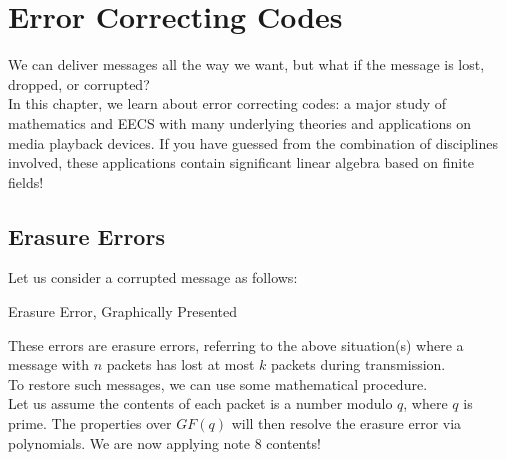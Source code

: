\chapter{Error Correcting Codes}
We can deliver messages all the way we want, but what if the message is lost, dropped, or corrupted? \\
In this chapter, we learn about error correcting codes: a major study of mathematics and EECS with many underlying theories and applications on media playback devices. If you have guessed from the combination of disciplines involved, these applications contain significant linear algebra based on finite fields!

\section{Erasure Errors}
Let us consider a corrupted message as follows:
\begin{ln-fig}{Erasure Error, Graphically Presented}{}
    \begin{center}
    \end{center}
\end{ln-fig}
These errors are erasure errors, referring to the above situation(s) where a message with $n$ packets has lost at most $k$ packets during transmission. \\
To restore such messages, we can use some mathematical procedure. \\
Let us assume the contents of each packet is a number modulo $q$, where $q$ is prime. The properties over $GF(q)$ will then resolve the erasure error via polynomials. We are now applying note 8 contents! \\

